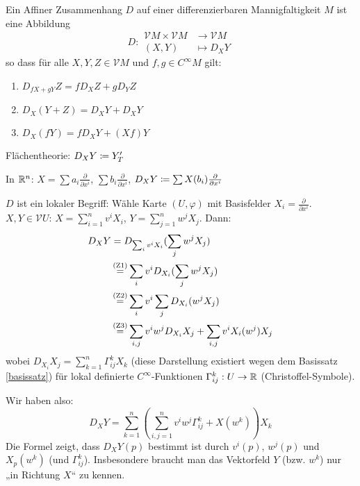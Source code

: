 \documentclass[a4paper,twoside,DIV15,BCOR12mm]{scrbook}
\newcommand{\V}{\mathcal V}
\begin{document}
\begin{definition}
Ein Affiner Zusammenhang $D$ auf einer differenzierbaren Mannigfaltigkeit $M$ ist eine Abbildung
\[
D: 
\begin{aligned}
\V M \times \V M &\to \V M \\
(X,Y) &\mapsto D_XY
\end{aligned}
\]
so dass für alle $X,Y,Z \in \V M$ und $f,g \in C^\infty M$ gilt:
\begin{enumerate}[(Z1)]
\item $D_{fX + gY} Z = fD_XZ + gD_YZ$
\item $D_X(Y + Z) = D_X Y + D_X Y$
\item $D_X(fY) = fD_XY + (Xf)Y$
\end{enumerate}
\end{definition}

\begin{beispiele}
\item Flächentheorie: $D_X Y \da Y_T'$
\item In $\mathbb{R}^n$: $X= \sum a_i \frac\partial{\partial x^i}$, $\sum b_i \frac\partial{\partial x^i}$, $D_XY\da \sum X(b_i) \frac\partial{\partial x^i}$
\end{beispiele}

$D$ ist ein lokaler Begriff: Wähle Karte $(U,\varphi)$ mit Basisfelder $X_i=\frac\partial{\partial x^i}$. $X,Y\in \V U$: $X=\sum_{i=1}^n v^iX_i$, $Y=\sum_{j=1}^n w^j X_j$. Dann: 
\begin{align*}
D_XY &= D_{\sum_i v^iX_i}(\sum_jw^jX_j) \\
     &\gleichnach{\clap{(Z1)}} \sum_i v^i D_{X_i}(\sum_jw^jX_j) \\
     &\gleichnach{\clap{(Z2)}} \sum_i v^i \sum_j D_{X_i} (w^j X_j) \\
     &\gleichnach{\clap{(Z3)}} \sum_{i,j} v^iw^j D_{X_i}X_j + \sum_{i,j} v^i X_i(w^j)X_j
\end{align*}
wobei $D_{X_i}X_j = \sum_{k=1}^n \Gamma^k_{ij} X_k$ (diese Darstellung existiert wegen dem Basissatz \ref{basissatz}) für lokal definierte $C^\infty$-Funktionen $\Gamma_{ij}^k: U \to \mathbb{R}$ (Christoffel-Symbole)\label{Christoffel-Symbole}.

Wir haben also:
\[
D_XY = \sum_{k=1}^n (\sum_{i,j=1}^n v^i w^j \Gamma_{ij}^k + X(w^k))X_k
\]
Die Formel zeigt, dass $D_XY(p)$ bestimmt ist durch $v^i(p)$, $w^j(p)$ und $X_p(w^k)$ (und $\Gamma_{ij}^k$). Insbesondere braucht man das Vektorfeld $Y$ (bzw. $w^k$) nur „in Richtung $X$“ zu kennen.
\end{document}

